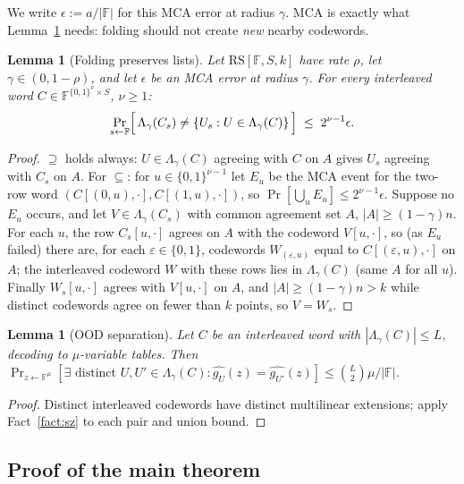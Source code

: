 \documentclass[11pt]{article}
\newcommand{\F}{\mathbb{F}}
\newcommand{\RS}{\mathrm{RS}}
\newcommand{\Lam}{\Lambda}
\newcommand{\cube}[1]{\{0,1\}^{#1}}
\newcommand{\pol}[1]{\widehat{#1}}
\theoremstyle{plain}
\newtheorem{lemma}[theorem]{Lemma}
\theoremstyle{definition}
\theoremstyle{remark}
\begin{document}
We write $\epsilon := a/|\F|$ for this MCA error at radius $\gamma$. MCA is exactly what Lemma~\ref{lem:fold-list} needs: folding should not create \emph{new} nearby codewords.

\begin{lemma}[Folding preserves lists]\label{lem:fold-list}
Let $\RS[\F,S,k]$ have rate $\rho$, let $\gamma \in (0, 1-\rho)$, and let $\epsilon$ be an MCA error at radius $\gamma$. For every interleaved word $C \in \F^{\cube{\nu} \times S}$, $\nu \ge 1$:
\[
\Pr_{s \leftarrow \F}\Bigl[\, \Lam_\gamma(C_s) \neq \{ U_s : U \in \Lam_\gamma(C) \} \,\Bigr] \;\le\; 2^{\nu-1} \epsilon .
\]
\end{lemma}

\begin{proof}
$\supseteq$ holds always: $U \in \Lam_\gamma(C)$ agreeing with $C$ on $A$ gives $U_s$ agreeing with $C_s$ on $A$. For $\subseteq$: for $u \in \cube{\nu-1}$ let $E_u$ be the MCA event for the two-row word $(C[(0,u),\cdot], C[(1,u),\cdot])$, so $\Pr[\bigcup_u E_u] \le 2^{\nu-1}\epsilon$. Suppose no $E_u$ occurs, and let $V \in \Lam_\gamma(C_s)$ with common agreement set $A$, $|A| \ge (1-\gamma)n$. For each $u$, the row $C_s[u,\cdot]$ agrees on $A$ with the codeword $V[u,\cdot]$, so (as $E_u$ failed) there are, for each $\varepsilon \in \{0,1\}$, codewords $W_{(\varepsilon,u)}$ equal to $C[(\varepsilon,u),\cdot]$ on $A$; the interleaved codeword $W$ with these rows lies in $\Lam_\gamma(C)$ (same $A$ for all $u$). Finally $W_s[u,\cdot]$ agrees with $V[u,\cdot]$ on $A$, and $|A| \ge (1-\gamma)n > k$ while distinct codewords agree on fewer than $k$ points, so $V = W_s$.
\end{proof}

\begin{lemma}[OOD separation]\label{lem:ood}
Let $C$ be an interleaved word with $|\Lam_\gamma(C)| \le L$, decoding to $\mu$-variable tables. Then $\Pr_{z \leftarrow \F^{\mu}}[\exists \text{ distinct } U, U' \in \Lam_\gamma(C) : \pol{g_U}(z) = \pol{g_{U'}}(z)] \le \binom{L}{2} \mu / |\F|$.
\end{lemma}

\begin{proof}
Distinct interleaved codewords have distinct multilinear extensions; apply Fact~\ref{fact:sz} to each pair and union bound.
\end{proof}

\subsection{Proof of the main theorem}\label{sec:state}
\end{document}
